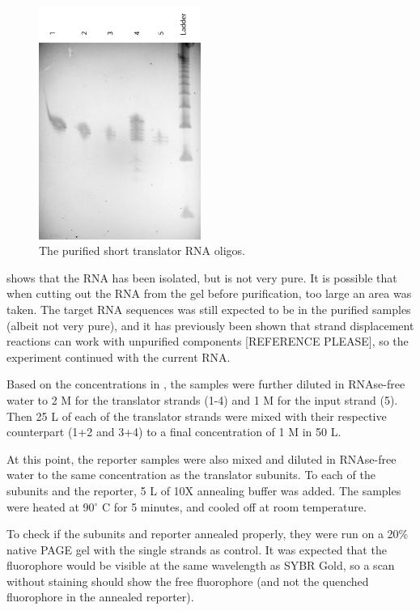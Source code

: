 \begin{figure}[H]
\centering
\includegraphics[width=150pt]{images/translator_transcription_purified.png}
\caption{The purified short translator RNA oligos.}
\label{translator_transcription_purified}
\end{figure}

 shows that the RNA has been isolated, but is not very pure. It is possible that when cutting out the RNA from the gel before purification, too large an area was taken. The target RNA sequences was still expected to be in the purified samples (albeit not very pure), and it has previously been shown that strand displacement reactions can work with unpurified components [REFERENCE PLEASE], so the experiment continued with the current RNA.

Based on the concentrations in , the samples were further diluted in RNAse-free water to 2 \si{\micro}M for the translator strands (1-4) and 1 \si{\micro}M for the input strand (5). Then 25 \si{\micro}L of each of the translator strands were mixed with their respective counterpart (1+2 and 3+4) to a final concentration of 1 \si{\micro}M in 50 \si{\micro}L.

At this point, the reporter samples were also mixed and diluted in RNAse-free water to the same concentration as the translator subunits. To each of the subunits and the reporter, 5 \si{\micro}L of 10X annealing buffer was added. The samples were heated at 90$^\circ$ C for 5 minutes, and cooled off at room temperature.

To check if the subunits and reporter annealed properly, they were run on a 20\% native PAGE gel with the single strands as control. It was expected that the fluorophore would be visible at the same wavelength as SYBR Gold, so a scan without staining should show the free fluorophore (and not the quenched fluorophore in the annealed reporter).

